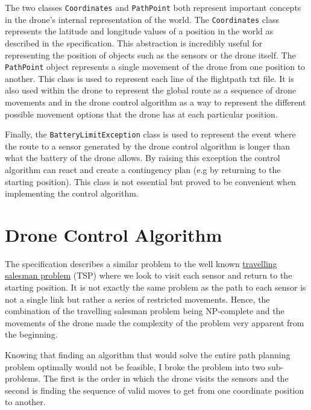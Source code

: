\documentclass[11pt]{article}
\begin{document}
The two classes \texttt{Coordinates} and \texttt{PathPoint} both represent important concepts in the drone's internal representation of the world. The \texttt{Coordinates} class represents the latitude and longitude values of a position in the world as described in the specification. This abstraction is incredibly useful for representing the position of objects such as the sensors or the drone itself. The \texttt{PathPoint} object represents a single movement of the drone from one position to another. This class is used to represent each line of the flightpath txt file. It is also used within the drone to represent the global route as a sequence of drone movements and in the drone control algorithm as a way to represent the different possible movement options that the drone has at each particular position.

Finally, the \texttt{BatteryLimitException} class is used to represent the event where the route to a sensor generated by the drone control algorithm is longer than what the battery of the drone allows. By raising this exception the control algorithm can react and create a contingency plan (e.g by returning to the starting position). This class is not essential but proved to be convenient when implementing the control algorithm.

\section{Drone Control Algorithm} \label{drone_alg}
The specification describes a similar problem to the well known \href{https://en.wikipedia.org/wiki/Travelling\_salesman\_problem}{travelling salesman problem} (TSP) where we look to visit each sensor and return to the starting position. It is not exactly the same problem as the path to each sensor is not a single link but rather a series of restricted movements. Hence, the combination of the travelling salesman problem being NP-complete and the movements of the drone made the complexity of the problem very apparent from the beginning.

Knowing that finding an algorithm that would solve the entire path planning problem optimally would not be feasible, I broke the problem into two sub-problems. The first is the order in which the drone visits the sensors and the second is finding the sequence of valid moves to get from one coordinate position to another.
\end{document}
